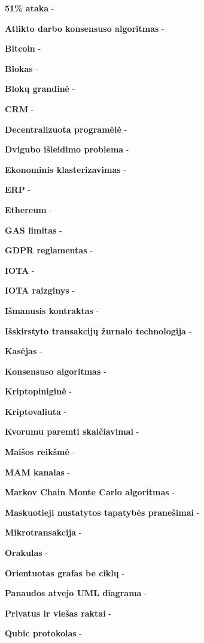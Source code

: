 
\noindent \textbf{51\% ataka} -

\noindent \textbf{Atlikto darbo konsensuso algoritmas} -

\noindent \textbf{Bitcoin} -

\noindent \textbf{Blokas} -

\noindent \textbf{Blokų grandinė} -

\noindent \textbf{CRM} -

\noindent \textbf{Decentralizuota programėlė} -

\noindent \textbf{Dvigubo išleidimo problema} -

\noindent \textbf{Ekonominis klasterizavimas} -

\noindent \textbf{ERP} -

\noindent \textbf{Ethereum} -

\noindent \textbf{GAS limitas} -

\noindent \textbf{GDPR reglamentas} -

\noindent \textbf{IOTA} -

\noindent \textbf{IOTA raizginys} -

\noindent \textbf{Išmanusis kontraktas} -

\noindent \textbf{Išskirstyto transakcijų žurnalo technologija} -

\noindent \textbf{Kasėjas} -

\noindent \textbf{Konsensuso algoritmas} -

\noindent \textbf{Kriptopiniginė} -

\noindent \textbf{Kriptovaliuta} -

\noindent \textbf{Kvorumu paremti skaičiavimai} -

\noindent \textbf{Maišos reikšmė} -

\noindent \textbf{MAM kanalas} -

\noindent \textbf{Markov Chain Monte Carlo algoritmas} -

\noindent \textbf{Maskuotieji nustatytos tapatybės pranešimai} -

\noindent \textbf{Mikrotransakcija} -

\noindent \textbf{Orakulas} -

\noindent \textbf{Orientuotas grafas be ciklų} -

\noindent \textbf{Panaudos atvejo UML diagrama} -

\noindent \textbf{Privatus ir viešas raktai} -

\noindent \textbf{Qubic protokolas} -

